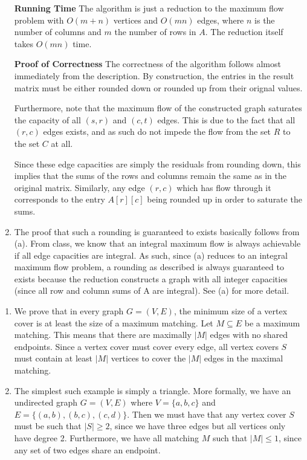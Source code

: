 \documentclass[12pt]{exam}
\newcommand{\Q}[1]{\question{\large{\textbf{#1}}}}
\begin{document}
\begin{questions}
\begin{solution}
\begin{enumerate}[label=(\alph*)]
    \textbf{Running Time}
    The algorithm is just a reduction to the maximum flow problem with $O(m + n)$ vertices and $O(mn)$ edges, where $n$ is the number of columns and $m$ the number of rows in $A$. The reduction itself takes $O(mn)$ time.

    \textbf{Proof of Correctness}
    The correctness of the algorithm follows almost immediately from the description. By construction, the entries in the result matrix must be either rounded down or rounded up from their orignal values.

    Furthermore, note that the maximum flow of the constructed graph saturates the capacity of all $(s,r)$ and $(c,t)$ edges. This is due to the fact that all $(r,c)$ edges exists, and as such do not impede the flow from the set $R$ to the set $C$ at all.

    Since these edge capacities are simply the residuals from rounding down, this implies that the sums of the rows and columns remain the same as in the original matrix. Similarly, any edge $(r,c)$ which has flow through it corresponds to the entry $A[r][c]$ being rounded up in order to saturate the sums.

    \item
      The proof that such a rounding is guaranteed to exists basically follows from (a). From class, we know that an integral maximum flow is always achievable if all edge capacities are integral. As such, since (a) reduces to an integral maximum flow problem, a rounding as described is always guaranteed to exists because the reduction constructs a graph with all integer capacities (since all row and column sums of A are integral). See (a) for more detail.
  \end{enumerate}
\end{solution}

\newpage
\Q{Problem 5}
\begin{solution}
  \begin{enumerate}[label=(\alph*)]
    \item 
      We prove that in every graph $G = (V,E)$, the minimum size of a vertex cover is at least the size of a maximum matching. Let $M \subseteq E$ be a maximum matching. This means that there are maximally $|M|$ edges with no shared endpoints. Since a vertex cover must cover every edge, all vertex covers $S$ must contain at least $|M|$ vertices to cover the $|M|$ edges in the maximal matching. 

    \item
      The simplest such example is simply a triangle. More formally, we have an undirected graph $G = (V,E)$ where $V = \{a,b,c\}$ and $E = \{ (a,b), (b,c), (c,d) \}$. Then we must have that any vertex cover $S$ must be such that $|S| \geq 2$, since we have three edges but all vertices only have degree 2. Furthermore, we have all matching $M$ such that $|M| \leq 1$, since any set of two edges share an endpoint.


\end{enumerate}
\end{solution}
\end{questions}
\end{document}
